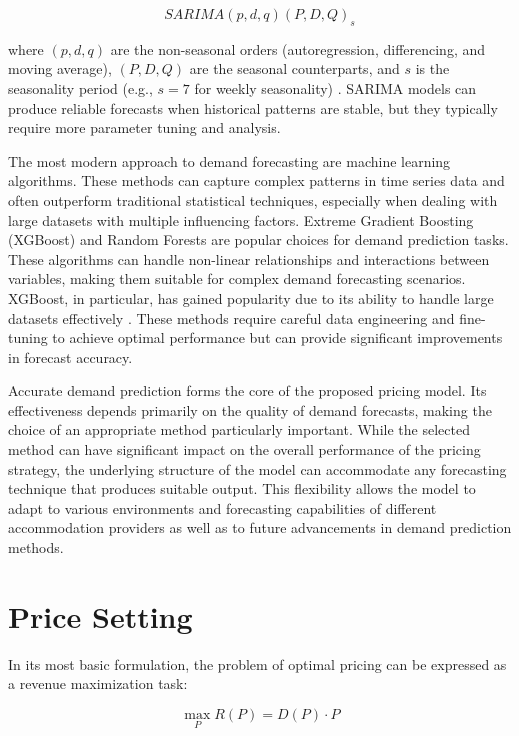 \begin{equation}
    SARIMA(p,d,q)(P,D,Q)_s
\end{equation}

where $(p,d,q)$ are the non-seasonal orders (autoregression, differencing, and moving average), $(P,D,Q)$ are the seasonal counterparts, and $s$ is the seasonality period (e.g., $s = 7$ for weekly seasonality) \cite{KumarDubey2021}. SARIMA models can produce reliable forecasts when historical patterns are stable, but they typically require more parameter tuning and analysis.

The most modern approach to demand forecasting are machine learning algorithms. These methods can capture complex patterns in time series data and often outperform traditional statistical techniques, especially when dealing with large datasets with multiple influencing factors. Extreme Gradient Boosting (XGBoost) and Random Forests are popular choices for demand prediction tasks. These algorithms can handle non-linear relationships and interactions between variables, making them suitable for complex demand forecasting scenarios. XGBoost, in particular, has gained popularity due to its ability to handle large datasets effectively \cite{Ampountolas2024}. These methods require careful data engineering and fine-tuning to achieve optimal performance but can provide significant improvements in forecast accuracy.

\medskip
Accurate demand prediction forms the core of the proposed pricing model. Its effectiveness depends primarily on the quality of demand forecasts, making the choice of an appropriate method particularly important. While the selected method can have significant impact on the overall performance of the pricing strategy, the underlying structure of the model can accommodate any forecasting technique that produces suitable output. This flexibility allows the model to adapt to various environments and forecasting capabilities of different accommodation providers as well as to future advancements in demand prediction methods.

\section{Price Setting}
In its most basic formulation, the problem of optimal pricing can be expressed as a revenue maximization task:

\begin{equation}
    \max_{P} R(P) = D(P) \cdot P
\end{equation}

